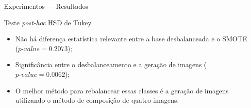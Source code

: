 \documentclass[10pt]{beamer}
\begin{document}
\begin{frame}{Experimentos --- Resultados}
  \setlength\leftmargini{1em}
  \begin{block}{Teste \textit{post-hoc} HSD de Tukey}
  \begin{itemize}
    \item Não há diferença estatística relevante entre a base desbalanceada e o SMOTE ($\textit{p-value}=0.2073$);
    \item Significância entre o desbalanceamento e a geração de imagens ($\textit{p-value}=0.0062$);
    \item O melhor método para rebalancear essas classes é a geração de imagens utilizando o método de composição de quatro imagens.
  \end{itemize}
  \end{block}
\end{frame}
\end{document}
